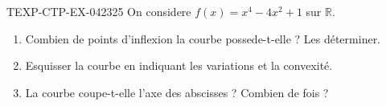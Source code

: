 \begin{exercice}{TEXP-CTP-EX-042}{3}{25}
On considere $f(x) = x^4 - 4x^2 + 1$ sur $\mathbb{R}$.
\begin{enumerate}
  \item Combien de points d'inflexion la courbe possede-t-elle ? Les déterminer.
  \item Esquisser la courbe en indiquant les variations et la convexité.
  \item La courbe coupe-t-elle l'axe des abscisses ? Combien de fois ?
\end{enumerate}

\end{exercice}
